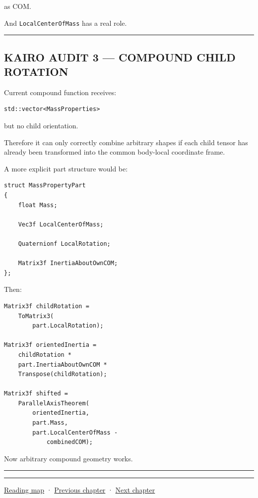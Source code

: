 as COM.

And \texttt{LocalCenterOfMass} has a real role.

\begin{center}\rule{0.5\linewidth}{0.5pt}\end{center}

\subsection{KAIRO AUDIT 3 --- COMPOUND CHILD ROTATION}\label{06-engine-ii-ch035-kairo-audit-3-compound-child-rotation}

\hypertarget{06-engine-ii-ch035-kairo-audit-3-compound-child-rotation}{}

Current compound function receives:

\begin{verbatim}
std::vector<MassProperties>
\end{verbatim}

but no child orientation.

Therefore it can only correctly combine arbitrary shapes if each child tensor has already been transformed into the common body-local coordinate frame.

A more explicit part structure would be:

\begin{verbatim}
struct MassPropertyPart
{
    float Mass;

    Vec3f LocalCenterOfMass;

    Quaternionf LocalRotation;

    Matrix3f InertiaAboutOwnCOM;
};
\end{verbatim}

Then:

\begin{verbatim}
Matrix3f childRotation =
    ToMatrix3(
        part.LocalRotation);

Matrix3f orientedInertia =
    childRotation *
    part.InertiaAboutOwnCOM *
    Transpose(childRotation);

Matrix3f shifted =
    ParallelAxisTheorem(
        orientedInertia,
        part.Mass,
        part.LocalCenterOfMass -
            combinedCOM);
\end{verbatim}

Now arbitrary compound geometry works.

\begin{center}\rule{0.5\linewidth}{0.5pt}\end{center}

\begin{center}\rule{0.5\linewidth}{0.5pt}\end{center}

\hyperref[volume-reading-map]{Reading map} · \hyperref[06-engine-ii-ch034-rigid-body-motion-from-forces-to-contact]{Previous chapter} · \hyperref[06-engine-ii-ch036-auditing-capsule-mass-properties-and-collision-formulas]{Next chapter}
